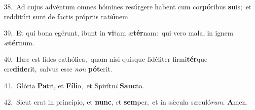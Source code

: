{\numbfont\textcolor{\numbcolor}{38.}}~Ad cujus advéntum omnes hómines resúrgere habent cum cor\-\textbf{pó}\-ribus \textbf{su}\-is;~\star et redditúri sunt de factis própriis ra\-\textit{ti}\-\textbf{ó}nem.\par
{\numbfont\textcolor{\numbcolor}{39.}}~Et qui bona egérunt, ibunt in \textbf{vi}\-tam æ\-\textbf{tér}\-nam:~\star qui vero mala, in ignem \textit{æ}\-\textbf{tér}num.\par
{\numbfont\textcolor{\numbcolor}{40.}}~Hæc est fides cathólica,~\dagger quam nisi quisque fidéliter firmi\-\textbf{tér}\-que cre\-\textbf{dí}\-\textbf{de}rit,~\star salvus esse \textit{non} \textbf{pót}\-erit.\par
{\numbfont\textcolor{\numbcolor}{41.}}~Glória \textbf{Pa}\-tri, et \textbf{Fí}\-\textbf{li}o,~\star et Spirítu\textit{i} \textbf{Sanc}\-to.\par
{\numbfont\textcolor{\numbcolor}{42.}}~Sicut erat in princípio, et \textbf{nunc}\-, et \textbf{sem}\-per,~\star et in sǽcula sæculó\-\textit{rum}\-. \textbf{A}\-men.\par

